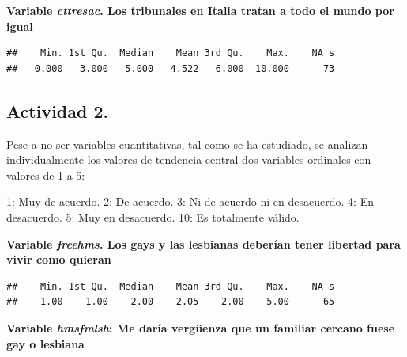 \documentclass[
  12 pt,
  a4paper,
]{article}
\newenvironment{Shaded}{\begin{snugshade}}{\end{snugshade}}
\newcommand{\FunctionTok}[1]{\textcolor[rgb]{0.13,0.29,0.53}{\textbf{#1}}}
\newcommand{\NormalTok}[1]{#1}
\newcommand{\SpecialCharTok}[1]{\textcolor[rgb]{0.81,0.36,0.00}{\textbf{#1}}}
\begin{document}
\textbf{Variable \emph{cttresac}. Los tribunales en Italia tratan a todo
el mundo por igual}

\begin{Shaded}
\end{Shaded}

\begin{verbatim}
##    Min. 1st Qu.  Median    Mean 3rd Qu.    Max.    NA's 
##   0.000   3.000   5.000   4.522   6.000  10.000      73
\end{verbatim}

\subsection{Actividad 2.}\label{actividad-2.}

Pese a no ser variables cuantitativas, tal como se ha estudiado, se
analizan individualmente los valores de tendencia central dos variables
ordinales con valores de 1 a 5:

1: Muy de acuerdo. 2: De acuerdo. 3: Ni de acuerdo ni en desacuerdo. 4:
En desacuerdo. 5: Muy en desacuerdo. 10: Es totalmente válido.

\textbf{Variable \emph{freehms}. Los gays y las lesbianas deberían tener
libertad para vivir como quieran}

\begin{Shaded}
\end{Shaded}

\begin{verbatim}
##    Min. 1st Qu.  Median    Mean 3rd Qu.    Max.    NA's 
##    1.00    1.00    2.00    2.05    2.00    5.00      65
\end{verbatim}

\textbf{Variable \emph{hmsfmlsh}: Me daría vergüenza que un familiar
cercano fuese gay o lesbiana}

\begin{Shaded}
\end{Shaded}
\end{document}
